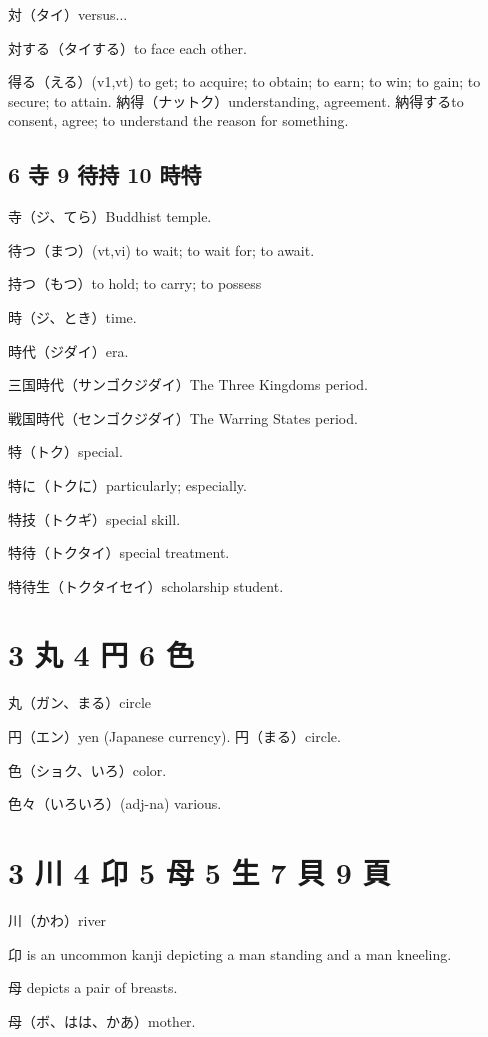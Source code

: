 対（タイ）versus...

対する（タイする）to face each other.

得る（える）(v1,vt) to get; to acquire; to obtain; to earn; to win; to gain; to secure; to attain.
納得（ナットク）understanding, agreement.
納得するto consent, agree; to understand the reason for something.

\subsection{6 寺 9 待持 10 時特}

寺（ジ、てら）Buddhist temple.

待つ（まつ）(vt,vi) to wait; to wait for; to await.

持つ（もつ）to hold; to carry; to possess

時（ジ、とき）time.

時代（ジダイ）era.

三国時代（サンゴクジダイ）The Three Kingdoms period.

戦国時代（センゴクジダイ）The Warring States period.

特（トク）special.

特に（トクに）particularly; especially.

特技（トクギ）special skill.

特待（トクタイ）special treatment.

特待生（トクタイセイ）scholarship student.

\section{3 丸 4 円 6 色}

丸（ガン、まる）circle

円（エン）yen (Japanese currency).
円（まる）circle.

色（ショク、いろ）color.

色々（いろいろ）(adj-na) various.

\section{3 川 4 卬 5 母 5 生 7 貝 9 頁}

川（かわ）river

卬 is an uncommon kanji depicting a man standing and a man kneeling.

母 depicts a pair of breasts.

母（ボ、はは、かあ）mother.

